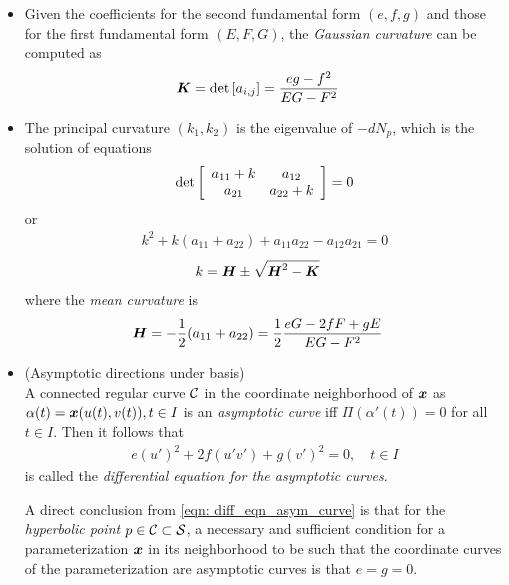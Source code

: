 \documentclass[11pt]{article}
\begin{document}
\begin{itemize}
\item Given the coefficients for the second fundamental form $(e,f,g)$ and those for the first fundamental form $(E,F,G)$, the \emph{Gaussian curvature} can be computed as 
\begin{align}
\boldsymbol{K} &= \det\left[a_{i,j}\right] = \frac{eg- f^{2}}{EG- F^{2}} \label{eqn: Gaussian_curvature}
\end{align}

\item 
The principal curvature $(k_{1}, k_{2})$ is the eigenvalue of $-dN_{p}$, which is the solution of equations
\begin{align*}
\det\left[\begin{array}{cc}
a_{11}+ k & a_{12} \\ 
a_{21} & a_{22}+k
\end{array} \right] = 0
\end{align*} or
\begin{align*}
k^{2}+ k(a_{11}+ a_{22}) + a_{11}a_{22} - a_{12}a_{21} = 0
\end{align*}
\begin{align}
k &= \boldsymbol{H} \pm \sqrt{\boldsymbol{H}^{2}- \boldsymbol{K}}  \label{eqn: principal_curv_coord}
\end{align}
where the \emph{mean curvature} is 
\begin{align}
\boldsymbol{H} &= -\frac{1}{2}(a_{11}+ a_{22}) = \frac{1}{2}\frac{eG - 2fF + gE}{EG-F^{2}}
\end{align}


\item (Asymptotic directions under basis)\\
A connected regular curve ${\mathcal C}$ in the coordinate neighborhood of $\boldsymbol{x}$ as $\alpha(t) = \boldsymbol{x}(u(t), v(t)), t\in I$ is an \emph{asymptotic curve} iff $\Pi(\alpha'(t)) = 0$ for all $t\in I$. Then it follows that
\begin{align}
e(u')^{2} + 2f(u'v') + g(v')^{2} = 0,\quad t\in I \label{eqn: diff_eqn_asym_curve}
\end{align}
is called the \emph{differential equation for the asymptotic curves}. 

A direct conclusion from \eqref{eqn: diff_eqn_asym_curve} is that for the \emph{hyperbolic point} $p\in {\mathcal C}\subset {\mathcal S}$, a necessary and sufficient condition for a parameterization $\boldsymbol{x}$ in its neighborhood to be such that the coordinate curves of the parameterization are asymptotic curves is that $e= g= 0$.


\end{itemize}
\end{document}
